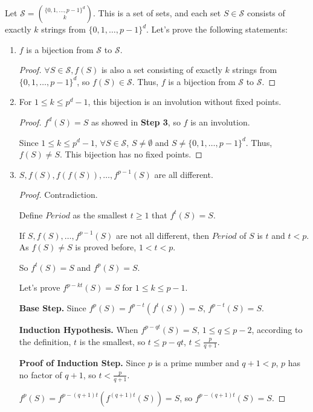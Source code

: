 Let $\mathcal{S} = { \{0,1, \dots, p-1\}^d \choose k }$. This is a set of sets, and each set $S \in \mathcal{S}$
consists of exactly $k$ strings from $\{0,1, \dots, p-1\}^d$. Let's prove the following statements: 
   \begin{enumerate}
   \item $f$ is a bijection from $\mathcal{S}$ to $\mathcal{S}$.
   \begin{proof}
   $\forall S \in \mathcal{S}, f(S)$ is also a set consisting of exactly $k$ strings from $\{0,1, \dots, p-1\}^d$, so $f(S) \in \mathcal{S}$. Thus, $f$ is a bijection from $\mathcal{S}$ to $\mathcal{S}$.
   \end{proof}
   \item For $1 \leq k \leq p^d-1$, this bijection is an involution without fixed points.
   \begin{proof}
   $f^d(S) = S$ as showed in \textbf{Step 3}, so $f$ is an involution.

   Since $1 \leq k \leq p^d - 1$, $\forall S \in \mathcal{S}$, $S \neq \emptyset$ and $S \neq \{0, 1, \dots, p-1\}^d$. Thus, $f(S) \neq S$. This bijection has no fixed points.

   \end{proof}

    \item $S, f(S), f(f(S)), \dots, f^{p-1}(S)$ are all different.
    \begin{proof}
        Contradiction.

        Define $Period$ as the smallest $t\geq1$ that $f^t(S) = S$. 

        If $S, f(S), \dots, f^{p-1}(S)$ are not all different, then $Period$ of $S$ is $t$ and $t < p$. As $f(S) \neq S$ is proved before, $1 < t < p$.

        So $f^t(S) = S$ and $f^p(S) = S$.

        Let's prove $f^{p-kt}(S) = S$ for $1 \leq k \leq p-1$.

        \textbf{Base Step.}
        Since $f^p(S) = f^{p-t}(f^t(S)) = S$, $f^{p-t}(S) = S$.

        \textbf{Induction Hypothesis.}
        When $f^{p-qt}(S) = S$, $1 \leq q \leq p-2$, according to the definition, $t$ is the smallest, so $t \leq p-qt$, $t \leq \frac{p}{q+1}$. 
        
        \textbf{Proof of Induction Step.}
        Since $p$ is a prime number and $q+1 < p$, $p$ has no factor of $q+1$, so $t < \frac{p}{q+1}$.

        $f^p(S) = f^{p-(q+1)t}(f^{(q+1)t}(S)) = S$, so $f^{p-(q+1)t}(S) = S$.


\end{proof}
\end{enumerate}
